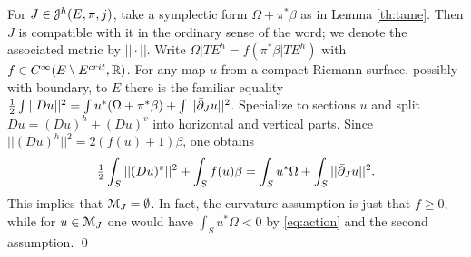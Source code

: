 \documentclass[10pt,letterpaper]{article}
\begin{document}
\proof For $J \in \mathcal{J}^h(E,\pi,j)$, take a symplectic form $\Omega + \pi^*\beta$
as in Lemma \ref{th:tame}. Then $J$ is compatible with it in the ordinary sense
of the word; we denote the associated metric by $||\cdot||$. Write $\Omega|TE^h
= f(\pi^*\beta|TE^h)$ with $f \in C^\infty(E \setminus E^{crit},\mathbb{R})$. For any map
$u$ from a compact Riemann surface, possibly with boundary, to $E$ there is the
familiar equality ${\textstyle\frac{1}{2}} \int ||Du||^2 = \int u^*(\Omega + \pi^*\beta) + \int
||\bar\partial_J u||^2$. Specialize to sections $u$ and split $Du = (Du)^h +
(Du)^v$ into horizontal and vertical parts. Since $||(Du)^h||^2 =
2(f(u)+1)\beta$, one obtains
\begin{equation} \label{eq:deficiency}
{\textstyle {\textstyle\frac{1}{2}}} \int_S ||(Du)^v||^2 + \int_S f(u)\beta = \int_S u^*\Omega +
\int_S ||\bar\partial_J u||^2.
\end{equation}
This implies that $\mathcal{M}_J = \emptyset$. In fact, the curvature assumption is
just that $f \geq 0$, while for $u \in \mathcal{M}_J$ one would have $\int_S u^*\Omega
< 0$ by \eqref{eq:action} and the second assumption. \qed
\end{document}
